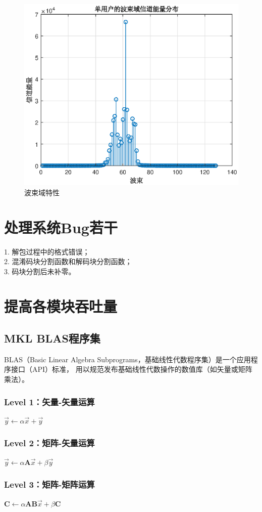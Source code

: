 \documentclass{article}
\begin{document}
\begin{figure}[H]
	\centering
	\includegraphics[width = .8\textwidth]{beam.eps}
	\caption{波束域特性}
\end{figure}

\section{处理系统Bug若干}
1. 解包过程中的格式错误；\\
2. 混淆码块分割函数和解码块分割函数；\\
3. 码块分割后未补零。

\section{提高各模块吞吐量}
\subsection{MKL BLAS程序集}
BLAS（Basic Linear Algebra Subprograms，基础线性代数程序集）是一个应用程序接口（API）标准，
用以规范发布基础线性代数操作的数值库（如矢量或矩阵乘法）。
\subsubsection{Level 1：矢量-矢量运算}
$\vec{y}\gets\alpha\vec{x}+\vec{y}$
\subsubsection{Level 2：矩阵-矢量运算}
$\vec{y}\gets\alpha\textbf{A}\vec{x}+\beta\vec{y}$
\subsubsection{Level 3：矩阵-矩阵运算}
$\textbf{C} \gets\alpha\textbf{A}\textbf{B}\vec{x}+\beta\textbf{C}$
\end{document}

